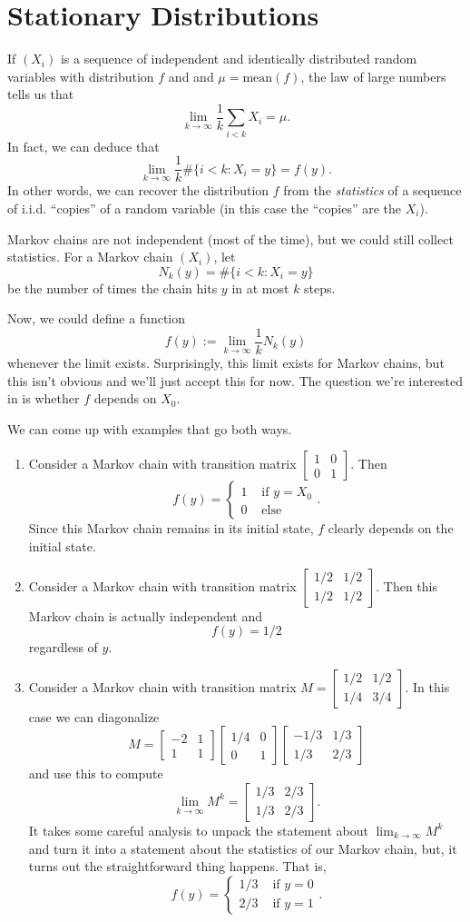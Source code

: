 \documentclass{problemset}
\newcommand{\mat}[1]{\begin{bmatrix}#1\end{bmatrix}}
\begin{document}
\section*{Stationary Distributions}
	
	If $(X_i)$ is a sequence of independent and identically distributed random variables
	with distribution $f$ and 
	and $\mu = \text{mean}(f)$, the law of large numbers tells us that
	\[
		\lim_{k\to\infty} \frac{1}{k} \sum_{i<k} X_i = \mu.
	\]
	In fact, we can deduce that
	\[
		\lim_{k\to\infty} \frac{1}{k} \#\{i<k:X_i=y\} = f(y).
	\]
	In other words, we can recover the distribution $f$ from the \emph{statistics}
	of a sequence of i.i.d. ``copies'' of a random variable (in this case the ``copies''
	are the $X_i$).

	Markov chains are not independent (most of the time), but we could still collect statistics.
	For a Markov chain $(X_i)$, let
	\[
		N_k(y) = \#\{i<k:X_i=y\}
	\]
	be the number of times the chain hits $y$ in at most $k$ steps.

	Now, we could define a function
	\[
		f(y) := \lim_{k\to\infty} \frac{1}{k} N_k(y)
	\]
	whenever the limit exists.  Surprisingly, this limit exists for Markov chains, but this isn't obvious
	and we'll just accept this for now.  The question we're interested in is whether $f$ depends on $X_0$.

	We can come up with examples that go both ways.
	\begin{enumerate}
		\item Consider a Markov chain with transition matrix $\mat{1&0\\0&1}$.  Then
			\[
				f(y) = \begin{cases}
					1 &\text{ if } y=X_0\\
					0 & \text{ else}
				\end{cases}.
			\]
			Since this Markov chain remains in its initial state, $f$ clearly depends on
			the initial state.
		\item Consider a Markov chain with transition matrix $\mat{1/2&1/2\\1/2&1/2}$.  Then
			this Markov chain is actually independent and
			\[
				f(y)=1/2
			\]
			regardless of $y$.
		\item Consider a Markov chain with transition matrix $M=\mat{1/2&1/2\\1/4 & 3/4}$.  In
			this case we can diagonalize 
			\[
				M=\mat{-2&1\\1&1} \mat{1/4&0\\0&1}\mat{-1/3&1/3\\1/3&2/3}
			\]
			and use this to compute
			\[
				\lim_{k\to\infty} M^k = \mat{1/3&2/3\\1/3&2/3}.
			\]
			It takes some careful analysis to unpack the statement about $\lim_{k\to\infty} M^k$
			and turn it into a statement about the statistics of our Markov chain,
			but, it turns out the straightforward thing happens.  That is,
			\[
				f(y)=\begin{cases}
					1/3&\text{ if }y=0\\
					2/3&\text{ if }y=1
				\end{cases}.
			\]
	\end{enumerate}
\end{document}
